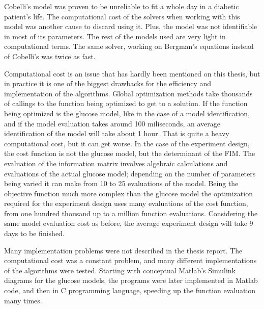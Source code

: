 Cobelli's model was proven to be unreliable to fit a whole day in a diabetic patient's life. The computational cost of the solvers when working with this model was another cause to discard using it. Plus, the model was not identifiable in most of its parameters. The rest of the models used are very light in computational terms. The same solver, working on Bergman's equations instead of Cobelli's was twice as fast.

Computational cost is an issue that has hardly been mentioned on this thesis, but in practice it is one of the biggest drawbacks for the efficiency and implementation of the algorithms. Global optimization methods take thousands of callings to the function being optimized to get to a solution. If the function being optimized is the glucose model, like in the case of a model identification, and if the model evaluation takes around 100 miliseconds, an average identification of the model will take about 1 hour. That is quite a heavy computational cost, but it can get worse. In the case of the experiment design, the cost function is not the glucose model, but the determinant of the FIM. The evaluation of the information matrix involves algebraic calculations and evaluations of the actual glucose model; depending on the number of parameters being varied it can make from 10 to 25 evaluations of the model. Being the objective function much more complex than the glucose model the optimization required for the experiment design uses many evaluations of the cost function, from one hundred thousand up to a million function evaluations. Considering the same model evaluation cost as before, the average experiment design will take 9 days to be finished.

Many implementation problems were not described in the thesis report. The computational cost was a constant problem, and many different implementations of the algorithms were tested. Starting with conceptual Matlab's Simulink diagrams for the glucose models, the programs were later implemented in Matlab code, and then in C programming language, speeding up the function evaluation many times. %

